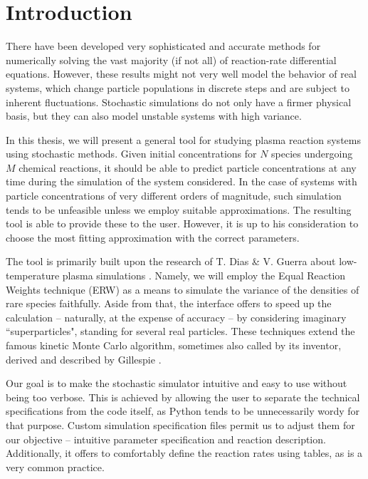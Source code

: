 \chapter*{Introduction}

There have been developed very sophisticated and accurate methods for numerically solving the vast majority (if not all) of reaction-rate differential equations. However, these results might not very well model the behavior of real systems, which change particle populations in discrete steps and are subject to inherent fluctuations. Stochastic simulations do not only have a firmer physical basis, but they can also model unstable systems with high variance.~\cite{gillespie77}  

In this thesis, we will present a general tool for studying plasma reaction systems using stochastic methods. Given initial concentrations for $N$ species undergoing $M$ chemical reactions, it should be able to predict particle concentrations at any time during the simulation of the system considered. In the case of systems with particle concentrations of very different orders of magnitude, such simulation tends to be unfeasible unless we employ suitable approximations. The resulting tool is able to provide these to the user. However, it is up to his consideration to choose the most fitting approximation with the correct parameters.

The tool is primarily built upon the research of T. Dias \& V. Guerra about low-temperature plasma simulations \cite{tiago20}. Namely, we will employ the Equal Reaction Weights technique (ERW) as a means to simulate the variance of the densities of rare species faithfully. Aside from that, the interface offers to speed up the calculation -- naturally, at the expense of accuracy -- by considering imaginary ``superparticles", standing for several real particles. These techniques extend the famous kinetic Monte Carlo algorithm, sometimes also called by its inventor, derived and described by Gillespie \cite{gillespie76, gillespie77}.

Our goal is to make the stochastic simulator intuitive and easy to use without being too verbose. This is achieved by allowing the user to separate the technical specifications from the code itself, as Python tends to be unnecessarily wordy for that purpose. Custom simulation specification files permit us to adjust them for our objective -- intuitive parameter specification and reaction description. Additionally, it offers to comfortably define the reaction rates using tables, as is a very common practice. 

